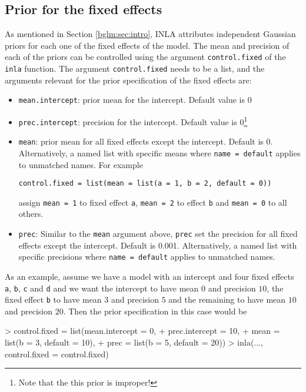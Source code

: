 \documentclass[a4paper,11pt]{report}
\newcommand{\tv}{\texttt}
\begin{document}
\subsection{Prior for the fixed effects}

As mentioned in Section \ref{bglm:sec:intro}, INLA attributes
independent Gaussian priors for each one of the fixed effects of the
model. The mean and precision of each of the priors can be controlled
using the argument \texttt{control.fixed} of the \texttt{inla}
function.  The argument \texttt{control.fixed} needs to be a list, and
the arguments relevant for the prior specification of the fixed
effects are:
\begin{itemize}
\item \texttt{mean.intercept}: prior mean for the intercept. Default value is 
    0
\item \texttt{prec.intercept}: precision for the intercept. Default
    value is
    0\footnote{Note
        that the this prior is improper!}
\item \texttt{mean}: prior mean for all fixed effects except the
    intercept.  Default is
    0.  Alternatively, a
    named list with specific means where \texttt{name = default}
    applies to unmatched names. For example
    \begin{center}
        \texttt{control.fixed = list(mean = list(a = 1, b = 2, default = 0))} 
    \end{center}
    assign \texttt{mean = 1} to fixed effect \texttt{a}, \texttt{mean
        = 2} to effect \texttt{b} and \texttt{mean = 0} to all others.
\item \texttt{prec}: Similar to the \texttt{mean} argument above,
    \texttt{prec} set the precision for all fixed effects except the
    intercept.  Default is
    0.001.  Alternatively, a
    named list with specific precisions where \texttt{name = default}
    applies to unmatched names.
\end{itemize}
As an example, assume we have a model with an intercept and four fixed
effects \tv{a}, \tv{b}, \tv{c} and \tv{d} and we want the intercept to
have mean $0$ and precision $10$, the fixed effect \tv{b} to have mean
$3$ and precision $5$ and the remaining to have mean $10$ and
precision $20$. Then the prior specification in this case would be
\begin{Schunk}
\begin{Sinput}
> control.fixed = list(mean.intercept = 0,
+                      prec.intercept = 10,
+                      mean = list(b = 3, default = 10),
+                      prec = list(b = 5, default = 20))
> inla(..., control.fixed = control.fixed)
\end{Sinput}
\end{Schunk}
\end{document}
